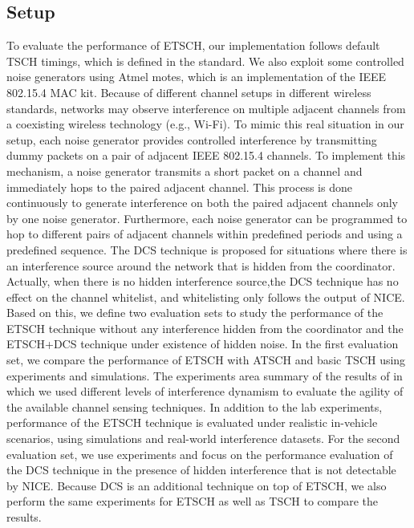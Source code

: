\documentclass[acmsmall, authorversion]{acmart}
\begin{document}
\subsection{Setup}
To evaluate the performance of ETSCH, our implementation follows default TSCH timings, which is defined in the standard. We also exploit some controlled noise generators using Atmel motes, which is an implementation of the IEEE 802.15.4 MAC kit. Because of different channel setups in different wireless standards, networks may observe interference on multiple adjacent channels from a coexisting wireless technology (e.g., Wi-Fi). To mimic this real situation in our setup, each noise generator provides controlled interference by transmitting dummy packets on a pair of adjacent IEEE 802.15.4 channels. To implement this mechanism, a noise generator transmits a short packet on a channel and immediately hops to the paired adjacent channel. This process is done continuously to generate interference on both the paired adjacent channels only by one noise generator. Furthermore, each noise generator can be programmed to hop to different pairs of adjacent channels within predefined periods and using a predefined sequence. The DCS technique is proposed for situations where there is an interference source around the network that is hidden from the coordinator. Actually, when there is no hidden interference source,the DCS technique has no effect on the channel whitelist, and whitelisting only follows the output of NICE. Based on this, we define two evaluation sets to study the performance of the ETSCH technique without any interference hidden from the coordinator and the ETSCH+DCS technique under existence of hidden noise. In the first evaluation set, we compare the performance of ETSCH with ATSCH and basic TSCH using experiments and simulations. The experiments area summary of the results of \cite{xia} in which we used different levels of interference dynamism to evaluate the agility of the available channel sensing techniques. In addition to the lab experiments, performance of the ETSCH technique is evaluated under realistic in-vehicle scenarios, using simulations and real-world interference datasets.
For the second evaluation set, we use experiments and focus on the performance evaluation of the DCS technique in the presence of hidden interference that is not detectable by NICE. Because DCS is an additional technique on top of ETSCH, we also perform the same experiments for ETSCH as well as TSCH to compare the results.
\end{document}

